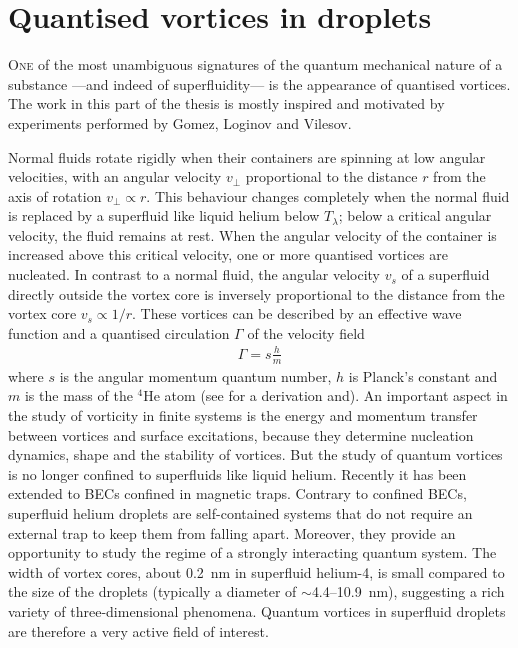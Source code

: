 \chapter{Quantised vortices in droplets}\label{sec:quant-vort}
	\lettrine[lines=4]{\color{activeColor}O}{ne} of the most unambiguous signatures of the quantum mechanical nature of a substance ---and indeed of superfluidity--- is the appearance of quantised vortices. The work in this part of the thesis is mostly inspired and motivated by experiments performed by Gomez, Loginov and Vilesov\citep{Gomez:2012,Gom14}. 
	
	Normal fluids rotate rigidly when their containers are spinning at low angular velocities, with an angular velocity $v_\perp$ proportional to the distance $r$ from the axis of rotation $v_\perp\propto r$. This behaviour changes completely when the normal fluid is replaced by a superfluid like liquid helium below $T_\lambda$; below a critical angular velocity, the fluid remains at rest. When the angular velocity of the container is increased above this critical velocity, one or more quantised vortices are nucleated. In contrast to a normal fluid, the angular velocity $v_s$ of a superfluid directly outside the vortex core is inversely proportional to the distance from the vortex core $v_s\propto 1/r$. These vortices can be described by an effective wave function and a quantised circulation $\Gamma$ of the velocity field
	\begin{align}
		\Gamma=s\frac{h}{m}	
	\end{align}
	where $s$ is the angular momentum quantum number, $h$ is Planck’s constant and $m$ is the mass of the $^4$He atom (see  for a derivation and). An important aspect in the study of vorticity in finite systems is the energy and momentum transfer between vortices and surface excitations, because they determine nucleation dynamics, shape and the stability of vortices. But the study of quantum vortices is no longer confined to superfluids like liquid helium. Recently\citep{Pit03,Fetter2009} it has been extended to BECs confined in magnetic traps. Contrary to confined BECs, superfluid helium droplets are self-contained systems that do not require an external trap to keep them from falling apart. Moreover, they provide an opportunity to study the regime of a strongly interacting quantum system. The width of vortex cores, about 0.2~nm\citep{Don91} in superfluid helium-4, is small compared to the size of the droplets (typically a diameter of $\sim$4.4--10.9~nm), suggesting a rich variety of three-dimensional phenomena. Quantum vortices in superfluid droplets are therefore a very active field of interest\citep{Clo98,Lehmann2003,Bar06,Sti06}. 
	
